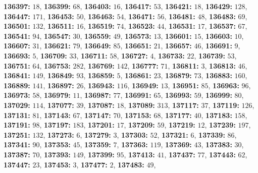 \textsf{\bfseries 136397:} $18$, \textsf{\bfseries 136399:} $68$, \textsf{\bfseries 136403:} $16$, \textsf{\bfseries 136417:} $53$, \textsf{\bfseries 136421:} $18$, \textsf{\bfseries 136429:} $128$, \textsf{\bfseries 136447:} $171$, \textsf{\bfseries 136453:} $50$, \textsf{\bfseries 136463:} $54$, \textsf{\bfseries 136471:} $56$, \textsf{\bfseries 136481:} $48$, \textsf{\bfseries 136483:} $69$, \textsf{\bfseries 136501:} $132$, \textsf{\bfseries 136511:} $16$, \textsf{\bfseries 136519:} $74$, \textsf{\bfseries 136523:} $44$, \textsf{\bfseries 136531:} $17$, \textsf{\bfseries 136537:} $67$, \textsf{\bfseries 136541:} $94$, \textsf{\bfseries 136547:} $30$, \textsf{\bfseries 136559:} $49$, \textsf{\bfseries 136573:} $13$, \textsf{\bfseries 136601:} $15$, \textsf{\bfseries 136603:} $10$, \textsf{\bfseries 136607:} $31$, \textsf{\bfseries 136621:} $79$, \textsf{\bfseries 136649:} $85$, \textsf{\bfseries 136651:} $21$, \textsf{\bfseries 136657:} $46$, \textsf{\bfseries 136691:} $9$, \textsf{\bfseries 136693:} $5$, \textsf{\bfseries 136709:} $33$, \textsf{\bfseries 136711:} $58$, \textsf{\bfseries 136727:} $4$, \textsf{\bfseries 136733:} $22$, \textsf{\bfseries 136739:} $53$, \textsf{\bfseries 136751:} $64$, \textsf{\bfseries 136753:} $282$, \textsf{\bfseries 136769:} $142$, \textsf{\bfseries 136777:} $71$, \textsf{\bfseries 136811:} $3$, \textsf{\bfseries 136813:} $46$, \textsf{\bfseries 136841:} $149$, \textsf{\bfseries 136849:} $93$, \textsf{\bfseries 136859:} $5$, \textsf{\bfseries 136861:} $23$, \textsf{\bfseries 136879:} $73$, \textsf{\bfseries 136883:} $160$, \textsf{\bfseries 136889:} $141$, \textsf{\bfseries 136897:} $26$, \textsf{\bfseries 136943:} $116$, \textsf{\bfseries 136949:} $13$, \textsf{\bfseries 136951:} $85$, \textsf{\bfseries 136963:} $96$, \textsf{\bfseries 136973:} $58$, \textsf{\bfseries 136979:} $11$, \textsf{\bfseries 136987:} $77$, \textsf{\bfseries 136991:} $65$, \textsf{\bfseries 136993:} $59$, \textsf{\bfseries 136999:} $80$, \textsf{\bfseries 137029:} $114$, \textsf{\bfseries 137077:} $39$, \textsf{\bfseries 137087:} $18$, \textsf{\bfseries 137089:} $313$, \textsf{\bfseries 137117:} $37$, \textsf{\bfseries 137119:} $126$, \textsf{\bfseries 137131:} $81$, \textsf{\bfseries 137143:} $67$, \textsf{\bfseries 137147:} $70$, \textsf{\bfseries 137153:} $68$, \textsf{\bfseries 137177:} $40$, \textsf{\bfseries 137183:} $158$, \textsf{\bfseries 137191:} $98$, \textsf{\bfseries 137197:} $183$, \textsf{\bfseries 137201:} $17$, \textsf{\bfseries 137209:} $59$, \textsf{\bfseries 137219:} $12$, \textsf{\bfseries 137239:} $197$, \textsf{\bfseries 137251:} $132$, \textsf{\bfseries 137273:} $6$, \textsf{\bfseries 137279:} $3$, \textsf{\bfseries 137303:} $52$, \textsf{\bfseries 137321:} $6$, \textsf{\bfseries 137339:} $86$, \textsf{\bfseries 137341:} $90$, \textsf{\bfseries 137353:} $45$, \textsf{\bfseries 137359:} $7$, \textsf{\bfseries 137363:} $119$, \textsf{\bfseries 137369:} $43$, \textsf{\bfseries 137383:} $30$, \textsf{\bfseries 137387:} $70$, \textsf{\bfseries 137393:} $149$, \textsf{\bfseries 137399:} $95$, \textsf{\bfseries 137413:} $41$, \textsf{\bfseries 137437:} $77$, \textsf{\bfseries 137443:} $62$, \textsf{\bfseries 137447:} $23$, \textsf{\bfseries 137453:} $3$, \textsf{\bfseries 137477:} $2$, \textsf{\bfseries 137483:} $49$, 
